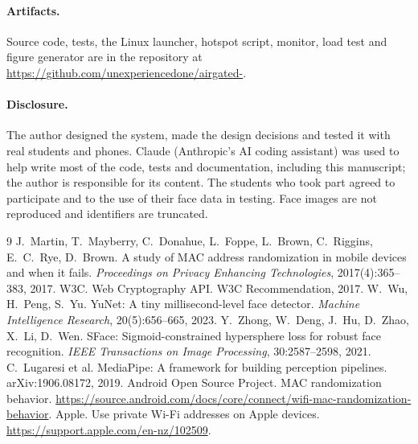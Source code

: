 \documentclass[11pt,a4paper]{article}
\begin{document}
\paragraph{Artifacts.} Source code, tests, the Linux launcher, hotspot script, monitor, load test and figure generator are in the repository at \url{https://github.com/unexperiencedone/airgated-}.

\paragraph{Disclosure.} The author designed the system, made the design decisions and tested it with real students and phones. Claude (Anthropic's AI coding assistant) was used to help write most of the code, tests and documentation, including this manuscript; the author is responsible for its content. The students who took part agreed to participate and to the use of their face data in testing. Face images are not reproduced and identifiers are truncated.

\begin{thebibliography}{9}
 J.~Martin, T.~Mayberry, C.~Donahue, L.~Foppe, L.~Brown, C.~Riggins, E.~C.~Rye, D.~Brown. A study of MAC address randomization in mobile devices and when it fails. \emph{Proceedings on Privacy Enhancing Technologies}, 2017(4):365--383, 2017.
 W3C. Web Cryptography API. W3C Recommendation, 2017.
 W.~Wu, H.~Peng, S.~Yu. YuNet: A tiny millisecond-level face detector. \emph{Machine Intelligence Research}, 20(5):656--665, 2023.
 Y.~Zhong, W.~Deng, J.~Hu, D.~Zhao, X.~Li, D.~Wen. SFace: Sigmoid-constrained hypersphere loss for robust face recognition. \emph{IEEE Transactions on Image Processing}, 30:2587--2598, 2021.
 C.~Lugaresi et al. MediaPipe: A framework for building perception pipelines. arXiv:1906.08172, 2019.
 Android Open Source Project. MAC randomization behavior. \url{https://source.android.com/docs/core/connect/wifi-mac-randomization-behavior}.
 Apple. Use private Wi-Fi addresses on Apple devices. \url{https://support.apple.com/en-nz/102509}.
\end{thebibliography}
\end{document}

